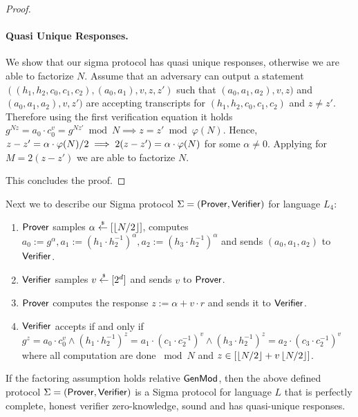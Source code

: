 \begin{proof}
\paragraph{Quasi Unique Responses.} We show that our sigma protocol has quasi unique responses, otherwise we are able to factorize $N$. Assume that an adversary can output a statement $((h_1, h_2, c_0, c_1, c_2), (a_0, a_1), v, z, z')$ such that $(a_0, a_1, a_2), v, z)$ and $(a_0, a_1, a_2), v, z')$ are accepting transcripts for $(h_1, h_2, c_0, c_1, c_2)$ and $z \neq z'$. Therefore using the first verification equation it holds $g^{Nz} = a_0 \cdot c_0^v = g^{Nz'} \bmod N \implies z = z' \bmod \varphi(N)$. Hence, $z-z' = \alpha \cdot \varphi(N)/2 \implies 2(z-z') = \alpha \cdot \varphi(N) $ for some $\alpha \neq 0$. Applying  for $M=2(z-z')$ we are able to factorize $N$.

This concludes the proof.
\end{proof}

Next we to describe our Sigma protocol $\Sigma = (\mathsf{Prover}, \mathsf{Verifier})$ for language $L_4$:
\begin{enumerate}
\item $\mathsf{Prover}$ samples $\alpha \stackrel{{\scriptscriptstyle\$}}{\leftarrow} [\left\lfloor N/2 \right\rfloor]$, computes $a_0:=g^\alpha, a_1:= (h_1\cdot h_2^{-1})^\alpha, a_2:= (h_3\cdot h_2^{-1})^\alpha$ and sends $(a_0, a_1, a_2)$ to $\mathsf{Verifier}$.
\item $\mathsf{Verifier}$ samples $v \stackrel{{\scriptscriptstyle\$}}{\leftarrow} [2^d]$ and sends $v$ to $\mathsf{Prover}$.
\item $\mathsf{Prover}$ computes the response $z:= \alpha + v \cdot r$ and sends it to $\mathsf{Verifier}$.
\item $\mathsf{Verifier}$ accepts if and only if $g^z = a_0 \cdot c_0^v \land (h_1\cdot h_2^{-1})^z = a_1 \cdot (c_1\cdot c_2^{-1})^v  \land (h_3\cdot h_2^{-1})^z = a_2 \cdot (c_3\cdot c_2^{-1})^v$ where all computation are done $\bmod N$ and $z \in [\left\lfloor N/2 \right\rfloor + v\left\lfloor N/2 \right\rfloor]$.
\end{enumerate}

\begin{theorem}
If the factoring assumption holds relative $\mathsf{GenMod}$, then the above defined protocol $\Sigma = (\mathsf{Prover}, \mathsf{Verifier})$ is a Sigma protocol for language $L$ that is perfectly complete, honest verifier zero-knowledge, sound and has quasi-unique responses. 
\end{theorem}

